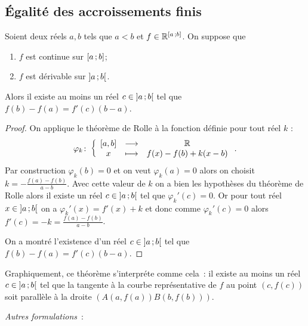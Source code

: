 \subsection{Égalité des accroissements finis}

\begin{theo}
  Soient deux réels $a,b$ tels que $a < b$ et $f \in \mathbb{R}^{\left[ a \, ;  b \right]}$. On suppose que
  \begin{enumerate}
  \item $f$ est continue sur $\left[ a \, ;  b \right]$;
  \item $f$ est dérivable sur $\left] a \, ;  b \right[$.
  \end{enumerate}
  Alors il existe au moins un réel $c \in \left] a \, ;  b \right[$ tel que $f(b)-f(a)=f'(c)(b-a)$. 
\end{theo}
\begin{proof}
  On applique le théorème de Rolle à la fonction définie pour tout réel $k$ :
  \begin{equation}
    \varphi_k\colon \left\{\begin{array}{ccc} [a,b] & \longrightarrow &\mathbb{R}\\ x & \longmapsto & f(x)-f(b)+k(x-b) \end{array} \right..
  \end{equation}
  Par construction $\varphi_k(b)=0$ et on veut $\varphi_k(a)=0$ alors on choisit $k = -\frac{f(a)-f(b)}{a-b}$. Avec cette valeur de $k$ on a bien les hypothèses du théorème de Rolle alors il existe un réel $c \in \left] a \, ;  b \right[$ tel que $\varphi_k'(c)=0$. Or pour tout réel $x \in \left] a \, ;  b \right[$ on a $\varphi_k'(x)=f'(x)+k$ et donc comme $\varphi_k'(c)=0$ alors $f'(c)=-k=\frac{f(a)-f(b)}{a-b}$.

On a montré l'existence d'un réel $c \in \left] a \, ;  b \right[$ tel que $f(b)-f(a)=f'(c)(b-a)$.
\end{proof}

Graphiquement, ce théorème s'interpréte comme cela~: il existe au moins un réel $c \in \left] a \, ;  b \right[$ tel que la tangente à la courbe représentative de $f$ au point $(c,f(c))$ soit parallèle à la droite $(A(a,f(a))B(b,f(b)))$.

\emph{Autres formulations}~:

